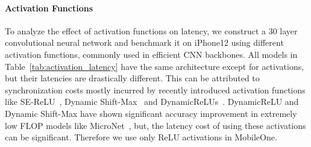 \paragraph{Activation Functions}
To analyze the effect of activation functions on latency, we construct a 30 layer convolutional neural network and benchmark it on iPhone12 using different activation functions, commonly used in efficient CNN backbones. All models in Table~\ref{tab:activation_latency} have the same architecture except for activations, but their latencies are drastically different. This can be attributed to synchronization costs mostly incurred by recently introduced activation functions like SE-ReLU~\cite{hu2018senet}, Dynamic Shift-Max~\cite{Li_2021_ICCV_micronet} and DynamicReLUs~\cite{chen2020dynamic}.
DynamicReLU and Dynamic Shift-Max have shown significant accuracy improvement in extremely low FLOP models like MicroNet~\cite{Li_2021_ICCV_micronet}, but, the latency cost of using these activations can be significant. 
Therefore we use only ReLU activations in MobileOne.

\begin{table}[]
 \vspace{-0.2cm}
 \centering
        \vspace{-0.2cm}
      \label{tab:activation_latency} 
      \vspace{-0.2cm}
\end{table}

